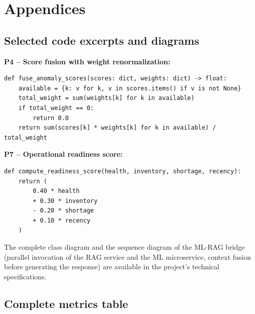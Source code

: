 \appendix
\chapter{Appendices}

\section{Selected code excerpts and diagrams}

\textbf{P4 -- Score fusion with weight renormalization:}

\begin{small}
\begin{verbatim}
def fuse_anomaly_scores(scores: dict, weights: dict) -> float:
    available = {k: v for k, v in scores.items() if v is not None}
    total_weight = sum(weights[k] for k in available)
    if total_weight == 0:
        return 0.0
    return sum(scores[k] * weights[k] for k in available) / total_weight
\end{verbatim}
\end{small}

\vspace{0.2em}
\textbf{P7 -- Operational readiness score:}

\begin{small}
\begin{verbatim}
def compute_readiness_score(health, inventory, shortage, recency):
    return (
        0.40 * health
        + 0.30 * inventory
        - 0.20 * shortage
        + 0.10 * recency
    )
\end{verbatim}
\end{small}

\vspace{0.5em}
The complete class diagram and the sequence diagram of the ML-RAG bridge (parallel invocation of the RAG service and the ML microservice, context fusion before generating the response) are available in the project's technical specifications.

\section{Complete metrics table}

